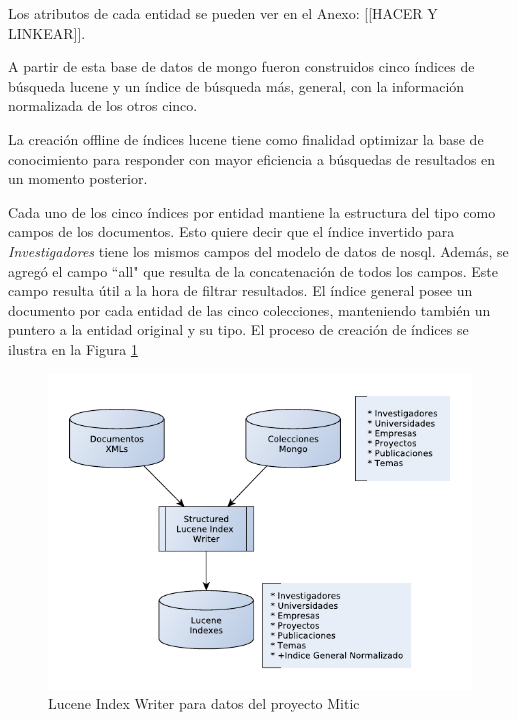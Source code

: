 Los atributos de cada entidad se pueden ver en el Anexo: [[HACER Y LINKEAR]].



A partir de esta base de datos de mongo fueron construidos cinco índices
de búsqueda lucene y un índice de búsqueda más, general, con la
información normalizada de los otros cinco. 

La creación offline de índices lucene tiene como finalidad optimizar
la base de conocimiento para responder con mayor eficiencia 
a búsquedas de resultados en un momento posterior. 

Cada uno de los cinco índices por entidad mantiene la estructura del tipo como campos de los documentos.
Esto quiere decir que el índice invertido para \emph{Investigadores} tiene los mismos campos
del modelo de datos de nosql. Además, se agregó el campo ``all" que resulta de la concatenación de
todos los campos. Este campo resulta útil a la hora de filtrar resultados. 
El índice general posee un documento por cada entidad de las cinco colecciones, 
manteniendo también un puntero a la entidad original y su tipo.
El proceso de creación de índices se ilustra en la Figura \ref{fig:LuceneIndexWriterEstructurado}%

 \begin{figure}[H]
   \centering
     \includegraphics{graficos/LuceneIndexWriterEstructurado}
   \caption{Lucene Index Writer para datos del proyecto Mitic}
   \label{fig:LuceneIndexWriterEstructurado}
 \end{figure}



